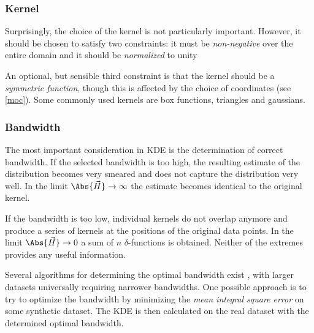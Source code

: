         \subsubsection{Kernel} \label{mmkk}
            Surprisingly, the choice of the kernel is not particularly important.
            However, it should be chosen to satisfy two constraints: it must be
            \emph{non-negative} over the entire domain
            and it should be \emph{normalized} to unity

            An optional, but sensible third constraint is that the kernel should be a \emph{symmetric function},
            though this is affected by the choice of coordinates (see \cref{moc}).
            Some commonly used kernels are box functions, triangles and gaussians.

        \subsubsection{Bandwidth} \label{mmkw}
            The most important consideration in KDE is the determination of correct bandwidth.
            If the selected bandwidth is too high, the resulting estimate of the distribution
            becomes very smeared and does not capture the distribution very well.
            In the limit $\Abs{\vec{H}} \to \infty$ the estimate becomes identical to the original kernel.

            If the bandwidth is too low, individual kernels do not overlap anymore and produce a series
            of kernels at the positions of the original data points. In the limit $\Abs{\vec{H}} \to 0$
            a sum of $n$ $\delta$-functions is obtained.
            Neither of the extremes provides any useful information.

            Several algorithms for determining the optimal bandwidth exist \citep{bowman1985,jones+1996},
            with larger datasets universally requiring narrower bandwidths.
            One possible approach is to try to optimize the bandwidth by minimizing the
            \emph{mean integral square error} on some synthetic dataset.
            The KDE is then calculated on the real dataset with the determined optimal bandwidth.

